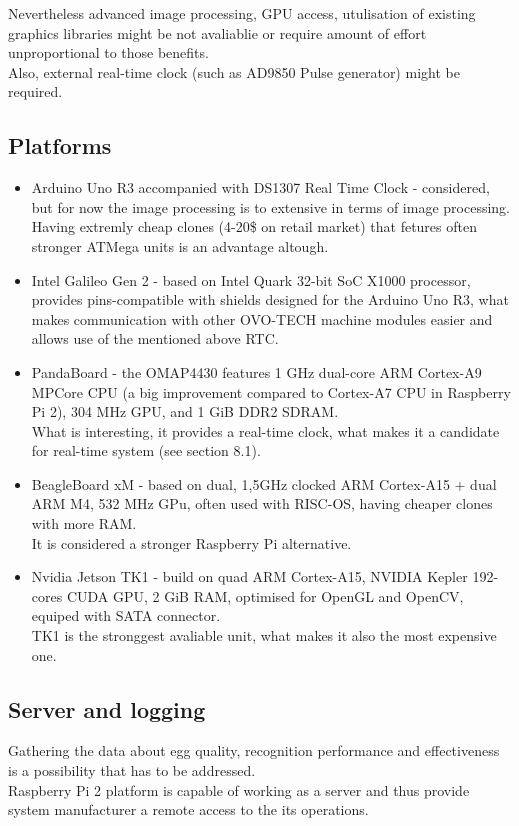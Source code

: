 \documentclass[12pt,twoside,a4paper]{article}
\begin{document}
Nevertheless advanced image processing, GPU access, utulisation of existing graphics libraries might be not avaliablie or require amount of effort unproportional to those benefits.\\
Also, external real-time clock (such as AD9850 Pulse generator) might be required.

\subsection{Platforms}
\begin{itemize}
  \item Arduino Uno R3 accompanied with DS1307 Real Time Clock - considered, but for now the image processing is to extensive in terms of image processing.\\
  Having extremly cheap clones (4-20\$ on retail market) that fetures often stronger ATMega units is an advantage altough.
  \item Intel Galileo Gen 2 - based on Intel Quark 32-bit SoC X1000 processor, provides pins-compatible with shields designed for the Arduino Uno R3, what makes communication with other OVO-TECH machine modules easier and allows use of the mentioned above RTC.
  \item PandaBoard - the OMAP4430 features 1 GHz dual-core ARM Cortex-A9 MPCore CPU (a big improvement compared to Cortex-A7 CPU in Raspberry Pi 2), 304 MHz GPU, and 1 GiB DDR2 SDRAM.\\
  What is interesting, it provides a real-time clock, what makes it a candidate for real-time system (see section 8.1).
  \item BeagleBoard xM - based on dual, 1,5GHz clocked ARM Cortex-A15  + dual ARM M4, 532 MHz GPu, often used with RISC-OS, having cheaper clones with more RAM.\\It is considered a stronger Raspberry Pi alternative.
  \item Nvidia Jetson TK1 - build on quad ARM Cortex-A15, NVIDIA Kepler 192-cores CUDA GPU, 2 GiB RAM, optimised for OpenGL and OpenCV, equiped with SATA connector.\\
  TK1 is the stronggest avaliable unit, what makes it also the most expensive one.

\end{itemize}
\subsection{Server and logging}
Gathering the data about egg quality, recognition performance and effectiveness is a possibility that has to be addressed.\\
Raspberry Pi 2 platform is capable of working as a server and thus provide system manufacturer a remote access to the its operations.
\end{document}
